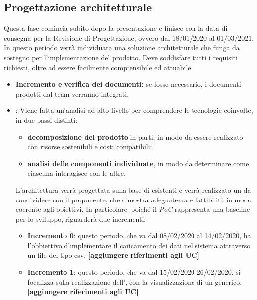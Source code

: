 \subsection{Progettazione architetturale}
Questa fase comincia subito dopo la presentazione e finisce con la data di consegna per la Revisione di Progettazione, ovvero dal 18/01/2020 al 01/03/2021.\\
In questo periodo verrà individuata una soluzione architetturale che funga da sostegno per l'implementazione del prodotto. Deve soddisfare tutti i requisiti richiesti, oltre ad essere facilmente comprensibile ed attuabile. 
\begin{itemize}
\item \textbf{Incremento e verifica dei documenti:} se fosse necessario, i documenti prodotti dal team verranno integrati.

 \item {}: Viene fatta un'analisi ad alto livello per comprendere le tecnologie coinvolte, in due passi distinti:
\begin{itemize}
 \item \textbf{decomposizione del prodotto} in parti, in modo da essere realizzato con risorse sostenibili e costi compatibili;
 \item \textbf{analisi delle componenti individuate}, in modo da determinare come ciascuna interagisce con le altre.  
\end{itemize}
L'architettura verrà progettata sulla base di  esistenti e verrà realizzato un  da condividere con il proponente, che dimostra adeguatezza e fattibilità in modo coerente agli obiettivi. In particolare, poiché il \textit{PoC} rappresenta una baseline per lo sviluppo, riguarderà due incrementi:
\begin{itemize}
	\item \textbf{Incremento 0}: questo periodo, che va dal 08/02/2020 al 14/02/2020, ha l'obbiettivo d'implementare il caricamento dei dati nel sistema attraverso un file del tipo csv. \textbf{[aggiungere riferimenti agli UC]}
	\item \textbf{Incremento 1}: questo periodo, che va dal 15/02/2020 26/02/2020. si focalizza sulla realizzazione dell', con la visualizzazione di un  generico. \textbf{[aggiungere riferimenti agli UC]}
\end{itemize} 

\end{itemize}

